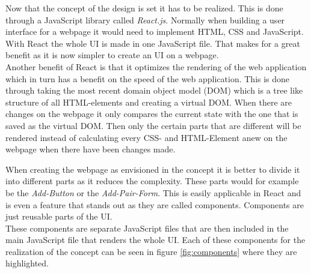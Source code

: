Now that the concept of the design is set it has to be realized. This is done through a JavaScript library called \textit{React.js}. Normally when building a user interface for a webpage it would need to implement HTML, CSS and JavaScript. With React the whole UI is made in one JavaScript file. That makes for a great benefit as it is now simpler to create an UI on a webpage. \\

Another benefit of React is that it optimizes the rendering of the web application which in turn has a benefit on the speed of the web application. This is done through taking the most recent domain object model (DOM) which is a tree like structure of all HTML-elements and creating a virtual DOM. When there are changes on the webpage it only compares the current state with the one that is saved as the virtual DOM. Then only the certain parts that are different will be rendered instead of calculating every CSS- and HTML-Element anew on the webpage when there have been changes made. \newpage

When creating the webpage as envisioned in the concept it is better to divide it into different parts as it reduces the complexity. These parts would for example be the \textit{Add-Button} or the \textit{Add-Pair-Form}. This is easily applicable in React and is even a feature that stands out as they are called components. Components are just reusable parts of the UI. \\

These components are separate JavaScript files that are then included in the main JavaScript file that renders the whole UI. Each of these components for the realization of the concept can be seen in figure \ref{fig:components} where they are highlighted.\\

